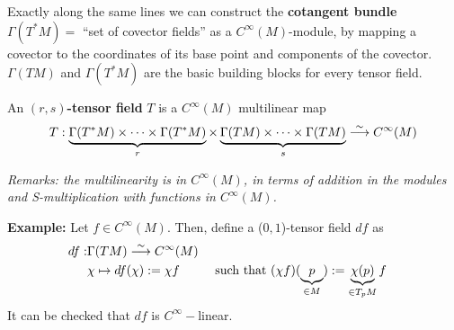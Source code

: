 Exactly along the same lines we can construct the \textbf{cotangent bundle} $\Gamma(T^*M) = $ ``set of covector fields'' as a $C^{\infty}(M)$-module, by mapping a covector to the coordinates of its base point and components of the covector. $\Gamma(TM)$ and $\Gamma(T^*M)$ are the basic building blocks for every tensor field.

\begin{definition}
An \textbf{$(r,s)$-tensor field} $T$ is a $C^{\infty}(M)$ multilinear map
\begin{equation}
T:\underbrace{\Gamma(T^*M) \times \dotsb \times \Gamma(T^*M)}_{r} \times \underbrace{\Gamma(TM) \times \dotsb \times \Gamma(TM)}_{s} \stackrel{\sim}{\longrightarrow} C^{\infty}(M)
\end{equation}
\end{definition}

\textit{Remarks: the multilinearity is in $C^{\infty}(M)$, in terms of addition in the modules and S-multiplication with functions in $C^{\infty}(M)$.}

\textbf{Example:} Let $f\in C^{\infty}(M)$. Then, define a ($0,1$)-tensor field $df$ as
\[
\begin{gathered}
  \begin{aligned} 
    df : & \Gamma(TM) \stackrel{\sim}{\longrightarrow} C^{\infty}(M) \\ 
    & \chi \mapsto df(\chi) := \chi f && \text{ such that } (\chi f)(\underbrace{p}_{ \in M}) := \underbrace{\chi(p)}_{\in T_pM}f
\end{aligned}
\end{gathered}
\]
It can be checked that $df$ is $C^{\infty}-$linear.
